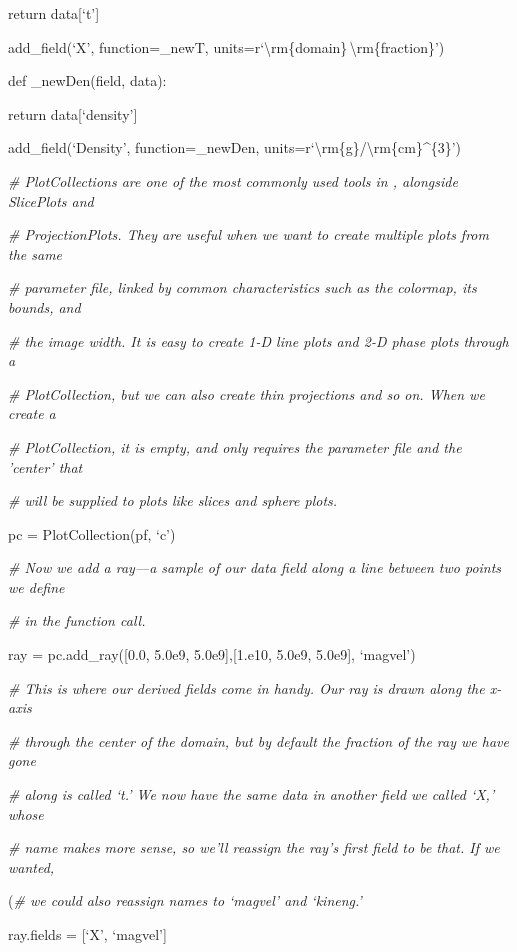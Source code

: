 {\setlength{\parindent}{18.5pt}return data[`t']}

add\_field(`X', function=\_newT, units=r`\textbackslash rm\{domain\}\,\textbackslash rm\{fraction\}')

def \_newDen(field, data):

{\setlength{\parindent}{18.5pt}return data[`density']}

add\_field(`Density', function=\_newDen, units=r`\textbackslash rm\{g\}/\textbackslash rm\{cm\}\^{}\{3\}')

{\it\# PlotCollections are one of the most commonly used tools in \yt, alongside SlicePlots and}
{\setlength{\parskip}{0pt}

{\it\# ProjectionPlots. They are useful when we want to create multiple plots from the same}

{\it\# parameter file, linked by common characteristics such as the colormap, its bounds, and}

{\it\# the image width. It is easy to create 1-D line plots and 2-D phase plots through a}

{\it\# PlotCollection, but we can also create thin projections and so on. When we create a}

{\it\# PlotCollection, it is empty, and only requires the parameter file and the 'center' that}

{\it\# will be supplied to plots like slices and sphere plots.}

pc = PlotCollection(pf, `c')
}

{\it\# Now we add a ray---a sample of our data field along a line between two points we define}
{\setlength{\parskip}{0pt}

{\it\# in the function call.}

ray = pc.add\_ray([0.0, 5.0e9, 5.0e9],[1.e10, 5.0e9, 5.0e9], `magvel')
}

{\it\# This is where our derived fields come in handy. Our ray is drawn along the x-axis}
{\setlength{\parskip}{0pt}

{\it\# through the center of the domain, but by default the fraction of the ray we have gone}

{\it\# along is called `t.' We now have the same data in another field we called `X,' whose}

{\it\# name makes more sense, so we'll reassign the ray's first field to be that. If we wanted,}

(\it\# we could also reassign names to `magvel' and `kineng.'

ray.fields = [`X', `magvel']
}

